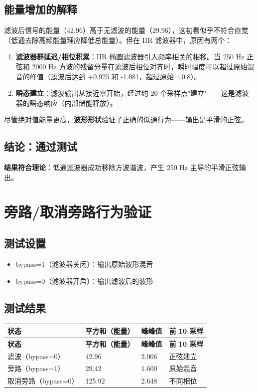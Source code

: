 ﻿\documentclass[12pt,a4paper,oneside]{ctexbook}
\begin{document}
\subsection{能量增加的解释}

滤波后信号的能量（42.96）高于无滤波的能量（29.96），这初看似乎不符合直觉（低通去除高频能量理应降低总能量）。但在 IIR 滤波器中，原因有两个：

\begin{enumerate}
    \item \textbf{滤波器群延迟/相位积累}：IIR 椭圆滤波器引入频率相关的相移。当 250 Hz 正弦和 2000 Hz 方波的残留分量在滤波后相位对齐时，瞬时幅度可以超过原始混音的峰值（滤波后达到 +0.925 和 -1.081，超过原始 ±0.8）。
    \item \textbf{瞬态建立}：滤波输出从接近零开始，经过约 20 个采样点"建立"——这是滤波器的瞬态响应（内部储能释放）。
\end{enumerate}

尽管绝对值能量更高，\textbf{波形形状}验证了正确的低通行为——输出是平滑的正弦。

\subsection{结论：通过测试}

\textbf{结果符合理论}：低通滤波器成功移除方波谐波，产生 250 Hz 主导的平滑正弦输出。

\section{旁路/取消旁路行为验证}

\subsection{测试设置}

\begin{itemize}
    \item bypass=1（滤波器关闭）：输出原始波形混音
    \item bypass=0（滤波器开启）：输出滤波后的波形
\end{itemize}

\subsection{测试结果}

\begin{longtable}{p{3cm}p{3cm}p{3cm}p{4cm}}
    \toprule
    \textbf{状态} & \textbf{平方和（能量）} & \textbf{峰峰值} & \textbf{前 10 采样} \\
    \midrule
    \endfirsthead
    \toprule
    \textbf{状态} & \textbf{平方和（能量）} & \textbf{峰峰值} & \textbf{前 10 采样} \\
    \midrule
    \endhead
    \bottomrule
    \endfoot
    滤波（bypass=0） & 42.96 & 2.006 & 正弦建立 \\
    旁路（bypass=1） & 29.42 & 1.600 & 原始混音 \\
    取消旁路（bypass=0） & 125.92 & 2.648 & 不同相位 \\
    \bottomrule
\end{longtable}
\end{document}
